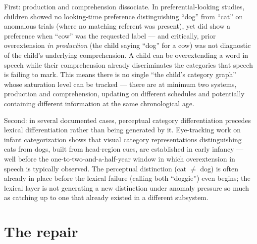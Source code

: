 First: production and comprehension dissociate. In preferential-looking studies, children showed no looking-time preference distinguishing ``dog'' from ``cat'' on anomalous trials (where no matching referent was present), yet did show a preference when ``cow'' was the requested label --- and critically, prior overextension \emph{in production} (the child saying ``dog'' for a cow) was not diagnostic of the child's underlying comprehension. A child can be overextending a word in speech while their comprehension already discriminates the categories that speech is failing to mark. This means there is no single ``the child's category graph'' whose saturation level can be tracked --- there are at minimum two systems, production and comprehension, updating on different schedules and potentially containing different information at the same chronological age.

Second: in several documented cases, perceptual category differentiation precedes lexical differentiation rather than being generated by it. Eye-tracking work on infant categorization shows that visual category representations distinguishing cats from dogs, built from head-region cues, are established in early infancy --- well before the one-to-two-and-a-half-year window in which overextension in speech is typically observed. The perceptual distinction (cat $\neq$ dog) is often already in place before the lexical failure (calling both ``doggie'') even begins; the lexical layer is not generating a new distinction under anomaly pressure so much as catching up to one that already existed in a different subsystem.

\section{The repair}

